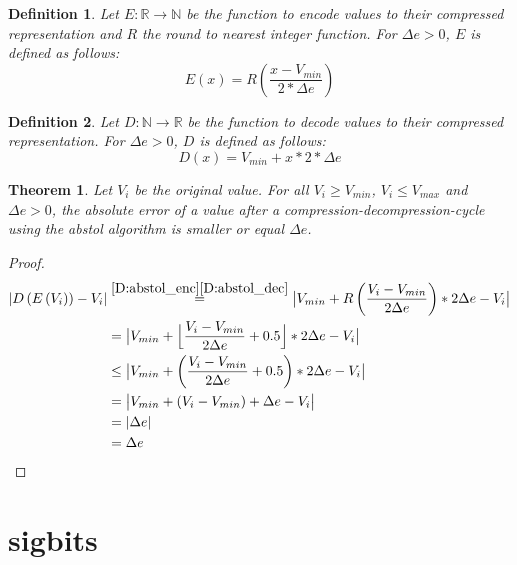 \documentclass[
	12pt,
	a4paper,
	BCOR10mm,
	DIV14,
	headsepline,
]{scrreprt}
\newtheorem{theorem}{Theorem}
\newtheorem{definition}{Definition}
\DeclarePairedDelimiter{\floor}{\lfloor}{\rfloor}
\DeclarePairedDelimiter{\abs}{\lvert}{\rvert}
\begin{document}
\bigskip

\begin{definition} \label{D:abstol_enc}
	Let $E:\mathbb{R}\rightarrow\mathbb{N}$ be the function to encode values to
	their compressed representation and $R$ the round to nearest integer
	function. For $\Delta{e}>0$, $E$ is defined as follows:
	\[
		E\left(x\right) =
			R
				\left(
					\frac{x - V_{min}}{2 * \Delta{e}}
				\right)
	\]
\end{definition}

\bigskip

\begin{definition} \label{D:abstol_dec}
	Let $D:\mathbb{N}\rightarrow\mathbb{R}$ be the function to decode values to
	their compressed representation. For $\Delta{e}>0$, $D$ is defined as
	follows:
	\[
		D\left(x\right) = V_{min} + x * 2 * \Delta{e}
	\]
\end{definition}

\clearpage

\begin{theorem} \label{T:abstol}
	Let $V_i$ be the original value. For all $V_i \ge V_{min}$,
	$V_i \le V_{max}$ and $\Delta{e} > 0$, the absolute error of a value after
	a compression-decompression-cycle using the abstol algorithm is smaller or
	equal $\Delta{e}$.
\end{theorem}

\begin{proof}
	\begingroup
	\addtolength{\jot}{1em}
	\begin{align*}
	  \lvert D\left(E\left(V_i\right)\right) - V_i\rvert
	  &\stackrel{\ref{D:abstol_enc}\ref{D:abstol_dec}}{=}\abs[\big]{V_{min} + R\left(\frac{V_i - V_{min}}{2\Delta{e}}\right) * 2\Delta{e} - V_i} \\
	  &=\abs[\big]{V_{min} + \floor[\Big]{\frac{V_i - V_{min}}{2\Delta{e}} + 0.5} * 2\Delta{e} - V_i} \\
	  &\le\abs[\big]{V_{min} + \left(\frac{V_i - V_{min}}{2\Delta{e}} + 0.5\right) * 2\Delta{e} - V_i} \\
	  &=\abs[\big]{V_{min} + \left(V_i - V_{min}\right) + \Delta{e} - V_i} \\
	  &=\abs{\Delta{e}} \\
	  &=\Delta{e} \qedhere
	\end{align*}
	\endgroup
\end{proof}

\chapter{sigbits}
\label{sigbits}
\end{document}
